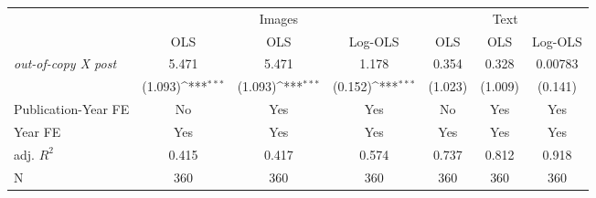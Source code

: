 {
\def\sym#1{\ifmmode^{#1}\else\(^{#1}\)\fi}
\begin{tabular*}{\hsize}{@{\hskip\tabcolsep\extracolsep\fill}l*{6}{c}}
\toprule
            &\multicolumn{3}{c}{Images}                                       &\multicolumn{3}{c}{Text}                                         \\\cmidrule(lr){2-4}\cmidrule(lr){5-7}
            &\multicolumn{1}{c}{OLS}&\multicolumn{1}{c}{OLS}&\multicolumn{1}{c}{Log-OLS}&\multicolumn{1}{c}{OLS}&\multicolumn{1}{c}{OLS}&\multicolumn{1}{c}{Log-OLS}\\
\midrule
\emph{out-of-copy X post}&       5.471         &       5.471         &       1.178         &       0.354         &       0.328         &     0.00783         \\
            &     (1.093)\sym{***}&     (1.093)\sym{***}&     (0.152)\sym{***}&     (1.023)         &     (1.009)         &     (0.141)         \\
\midrule
Publication-Year FE&          No         &         Yes         &         Yes         &          No         &         Yes         &         Yes         \\
Year FE     &         Yes         &         Yes         &         Yes         &         Yes         &         Yes         &         Yes         \\
adj. $R^2$  &       0.415         &       0.417         &       0.574         &       0.737         &       0.812         &       0.918         \\
N           &         360         &         360         &         360         &         360         &         360         &         360         \\
\bottomrule
\end{tabular*}
}
